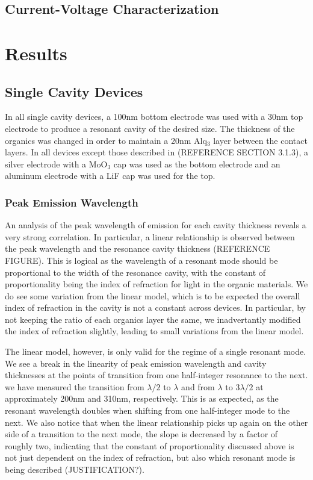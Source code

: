 \documentclass{report}
\begin{document}
    \section{Current-Voltage Characterization}

\chapter{Results}

    \section{Single Cavity Devices}
    
        In all single cavity devices, a 100nm bottom electrode was used with a 30nm top electrode to produce a resonant cavity of the desired size. The thickness of the organics was changed in order to maintain a 20nm Alq$_3$ layer between the contact layers. In all devices except those described in (REFERENCE SECTION 3.1.3), a silver electrode with a MoO$_3$ cap was used as the bottom electrode and an aluminum electrode with a LiF cap was used for the top.
    
        \subsection{Peak Emission Wavelength}
            An analysis of the peak wavelength of emission for each cavity thickness reveals a very strong correlation. In particular, a linear relationship is observed between the peak wavelength and the resonance cavity thickness (REFERENCE FIGURE). This is logical as the wavelength of a resonant mode should be proportional to the width of the resonance cavity, with the constant of proportionality being the index of refraction for light in the organic materials. We do see some variation from the linear model, which is to be expected the overall index of refraction in the cavity is not a constant across devices. In particular, by not keeping the ratio of each organics layer the same, we inadvertantly modified the index of refraction slightly, leading to small variations from the linear model.
            
            The linear model, however, is only valid for the regime of a single resonant mode. We see a break in the linearity of peak emission wavelength and cavity thicknesses at the points of transition from one half-integer resonance to the next. we have measured the transition from $\lambda/2$ to $\lambda$ and from $\lambda$ to $3\lambda/2$ at approximately 200nm and 310nm, respectively. This is as expected, as the resonant wavelength doubles when shifting from one half-integer mode to the next. We also notice that when the linear relationship picks up again on the other side of a transition to the next mode, the slope is decreased by a factor of roughly two, indicating that the constant of proportionality discussed above is not just dependent on the index of refraction, but also which resonant mode is being described (JUSTIFICATION?).
        
\end{document}
